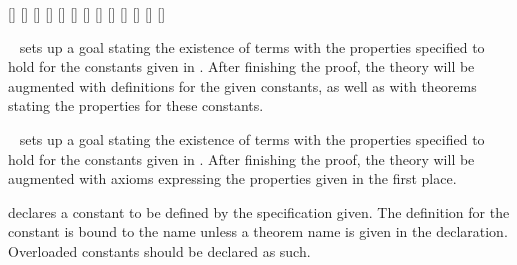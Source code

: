 \begin{isabellebody}
\begin{isamarkuptext}
  \begin{railoutput}
\rail@bar
{}[]
[]
\rail@endbar
{}[]
\rail@plus
{}[]
\rail@endplus
{}[]
\rail@plus
\rail@bar
{}
[]
\rail@endbar
{}[]
\rail@endplus
\rail@end
{}
\rail@bar
{}
[]
[]
\rail@endbar
{}[]
[]
[]
\rail@bar
{}
[]
\rail@endbar
\rail@end
\end{railoutput}


  \begin{description}

  \item \hyperlink{command.HOL.specification}{\mbox{}}~ sets up a
  goal stating the existence of terms with the properties specified to
  hold for the constants given in .  After finishing the
  proof, the theory will be augmented with definitions for the given
  constants, as well as with theorems stating the properties for these
  constants.

  \item \hyperlink{command.HOL.ax-specification}{\mbox{}}~ sets up
  a goal stating the existence of terms with the properties specified
  to hold for the constants given in .  After finishing
  the proof, the theory will be augmented with axioms expressing the
  properties given in the first place.

  \item {} declares a constant to be defined by the
  specification given.  The definition for the constant  is
  bound to the name  unless a theorem name is given in
  the declaration.  Overloaded constants should be declared as such.


\end{description}
\end{isamarkuptext}
\end{isabellebody}
